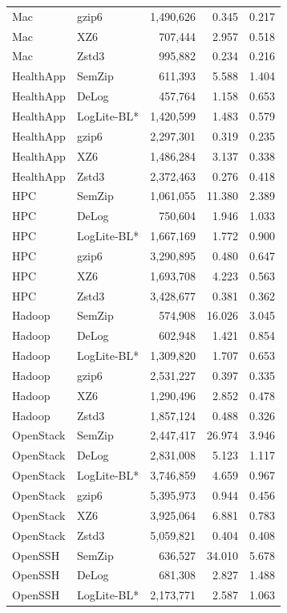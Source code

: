 \begin{longtable}{llrrr}
Mac & gzip6 & 1,490,626 & 0.345 & 0.217 \\
Mac & XZ6 & 707,444 & 2.957 & 0.518 \\
Mac & Zstd3 & 995,882 & 0.234 & 0.216 \\
HealthApp & SemZip & 611,393 & 5.588 & 1.404 \\
HealthApp & DeLog & 457,764 & 1.158 & 0.653 \\
HealthApp & LogLite-BL* & 1,420,599 & 1.483 & 0.579 \\
HealthApp & gzip6 & 2,297,301 & 0.319 & 0.235 \\
HealthApp & XZ6 & 1,486,284 & 3.137 & 0.338 \\
HealthApp & Zstd3 & 2,372,463 & 0.276 & 0.418 \\
HPC & SemZip & 1,061,055 & 11.380 & 2.389 \\
HPC & DeLog & 750,604 & 1.946 & 1.033 \\
HPC & LogLite-BL* & 1,667,169 & 1.772 & 0.900 \\
HPC & gzip6 & 3,290,895 & 0.480 & 0.647 \\
HPC & XZ6 & 1,693,708 & 4.223 & 0.563 \\
HPC & Zstd3 & 3,428,677 & 0.381 & 0.362 \\
Hadoop & SemZip & 574,908 & 16.026 & 3.045 \\
Hadoop & DeLog & 602,948 & 1.421 & 0.854 \\
Hadoop & LogLite-BL* & 1,309,820 & 1.707 & 0.653 \\
Hadoop & gzip6 & 2,531,227 & 0.397 & 0.335 \\
Hadoop & XZ6 & 1,290,496 & 2.852 & 0.478 \\
Hadoop & Zstd3 & 1,857,124 & 0.488 & 0.326 \\
OpenStack & SemZip & 2,447,417 & 26.974 & 3.946 \\
OpenStack & DeLog & 2,831,008 & 5.123 & 1.117 \\
OpenStack & LogLite-BL* & 3,746,859 & 4.659 & 0.967 \\
OpenStack & gzip6 & 5,395,973 & 0.944 & 0.456 \\
OpenStack & XZ6 & 3,925,064 & 6.881 & 0.783 \\
OpenStack & Zstd3 & 5,059,821 & 0.404 & 0.408 \\
OpenSSH & SemZip & 636,527 & 34.010 & 5.678 \\
OpenSSH & DeLog & 681,308 & 2.827 & 1.488 \\
OpenSSH & LogLite-BL* & 2,173,771 & 2.587 & 1.063 \\

\end{longtable}
